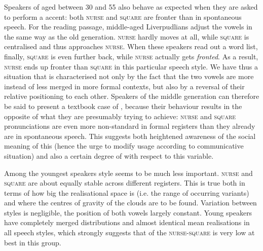 Speakers of  aged between 30 and 55 also behave as expected when they are asked to perform a   accent: both \textsc{nurse} and \textsc{square} are fronter than in spontaneous speech.
For the reading passage, middle-aged Liverpudlians adjust the vowels in the same way as the old generation.
\textsc{nurse} hardly moves at all, while \textsc{square} is centralised and thus approaches \textsc{nurse}.
When these speakers read out a word list, finally, \textsc{square} is even further back, while \textsc{nurse} actually gets \emph{fronted}.
As a result, \textsc{nurse} ends up fronter than \textsc{square} in this particular speech style.
We have thus a situation that is characterised not only by the fact that the two vowels are more instead of less merged in more formal contexts, but also by a reversal of their relative positioning to each other.
Speakers of the middle generation can therefore be said to present a textbook case of , because their behaviour results in the opposite of what they are presumably trying to achieve: \textsc{nurse} and \textsc{square} pronunciations are even more non-standard in formal registers than they already are in spontaneous speech.
This suggests both heightened awareness of the social meaning of this  (hence the urge to modify usage according to communicative situation) and also a certain degree of  with respect to this variable.

Among the youngest speakers style seems to be much less important.
\textsc{nurse} and \textsc{square} are about equally stable across different registers.
This is true both in terms of how big the realisational space is (i.e. the range of occurring variants) and where the centres of gravity of the  clouds are to be found.
Variation between styles is negligible, the position of both vowels largely constant.
Young speakers have completely merged distributions and almost identical mean realisations in all speech styles, which strongly suggests that  of the \textsc{nurse}-\textsc{square}  is very low at best in this group.

